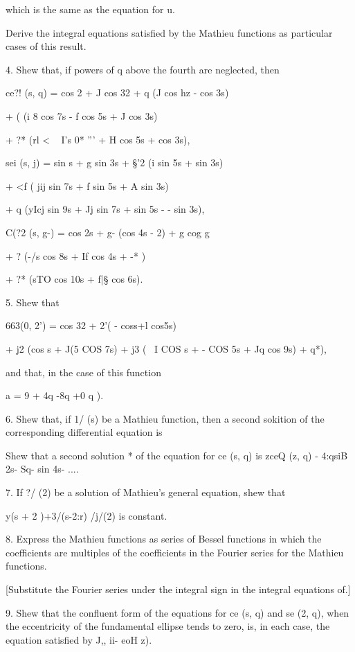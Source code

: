 {{which is the same as the equation for u.

Derive the integral equations satisfied by the Mathieu functions as
particular cases of this result.

%
%

4. Shew that, if powers of q above the fourth are neglected, then

ce?! (s, q) = cos 2 + J cos 32 + q (J cos hz - cos 3s)

+ ( (i 8 cos 7s - f cos 5s + J cos 3s)

+ ?* (rl < ~ I's 0* ''' + H cos 5s + cos 3s),

sei (s, j) = sin s + g sin 3s + §'2 (i sin 5s + sin 3s)

+ <f ( jij sin 7s + f sin 5s + A sin 3s)

+ q (yIcj sin 9s + Jj sin 7s + sin 5s - - sin 3s),

C(?2 (s, g-) = cos 2s + g- (cos 4s - 2) + g cog g

+ ? (-/s cos 8s + If cos 4s + -* )

+ ?* (sTO cos 10s + f|§ cos 6s).


5. Shew that

663(0, 2') = cos 32 + 2'( - coss+l cos5s)

+ j2 (cos s + J(5 COS 7s) + j3 ( \ I COS s + - COS 5s + Jq cos 9s) +
q*),

and that, in the case of this function

a = 9 + 4q -8q +0 q ).


6. Shew that, if 1/ (s) be a Mathieu function, then a second sokition
of the corresponding differential equation is

Shew that a second solution * of the equation for ce (s, q) is zceQ
(z, q) - 4:qsiB 2s- Sq- sin 4s- ....

7. If ?/ (2) be a solution of Mathieu's general equation, shew that

 y(s + 2 )+3/(s-2:r) /j/(2) is constant.

8. Express the Mathieu functions as series of Bessel functions in
which the coefficients are multiples of the coefficients in the
Fourier series for the Mathieu functions.

[Substitute the Fourier series under the integral sign in the integral
equations of.]

9. Shew that the confluent form of the equations for ce (s, q) and se
(2, q), when the eccentricity of the fundamental ellipse tends to
zero, is, in each case, the equation satisfied by J,, ii- eoH z).

}}
